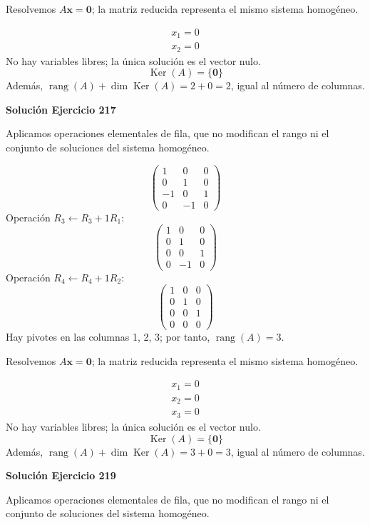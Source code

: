 \documentclass[12pt]{article}
\theoremstyle{remark}
\newcommand{\rang}{\operatorname{rang}}
\newcommand{\Ker}{\operatorname{Ker}}
\newcommand{\vect}[1]{\boldsymbol{#1}}
\begin{document}
Resolvemos $A\vect x=\vect0$; la matriz reducida representa el mismo sistema homogéneo.

\[
\begin{aligned}x_{1}=0\\x_{2}=0\end{aligned}
\]
No hay variables libres; la única solución es el vector nulo.
\[
\boxed{\Ker(A)=\{\vect0\}}
\]
Además, $\rang(A)+\dim\Ker(A)=2+0=2$, igual al número de columnas.


\par\bigskip\noindent\textbf{Solución Ejercicio 217}\par\nobreak
Aplicamos operaciones elementales de fila, que no modifican el rango ni el conjunto de soluciones del sistema homogéneo.

\[
\begin{pmatrix}1&0&0\\0&1&0\\-1&0&1\\0&-1&0\end{pmatrix}
\]
Operación $R_{3}\leftarrow R_{3}+1R_{1}$:
\[
\begin{pmatrix}1&0&0\\0&1&0\\0&0&1\\0&-1&0\end{pmatrix}
\]
Operación $R_{4}\leftarrow R_{4}+1R_{2}$:
\[
\begin{pmatrix}1&0&0\\0&1&0\\0&0&1\\0&0&0\end{pmatrix}
\]
Hay pivotes en las columnas 1, 2, 3; por tanto, $\boxed{\rang(A)=3}$.

Resolvemos $A\vect x=\vect0$; la matriz reducida representa el mismo sistema homogéneo.

\[
\begin{aligned}x_{1}=0\\x_{2}=0\\x_{3}=0\end{aligned}
\]
No hay variables libres; la única solución es el vector nulo.
\[
\boxed{\Ker(A)=\{\vect0\}}
\]
Además, $\rang(A)+\dim\Ker(A)=3+0=3$, igual al número de columnas.


\par\bigskip\noindent\textbf{Solución Ejercicio 219}\par\nobreak
Aplicamos operaciones elementales de fila, que no modifican el rango ni el conjunto de soluciones del sistema homogéneo.
\end{document}
